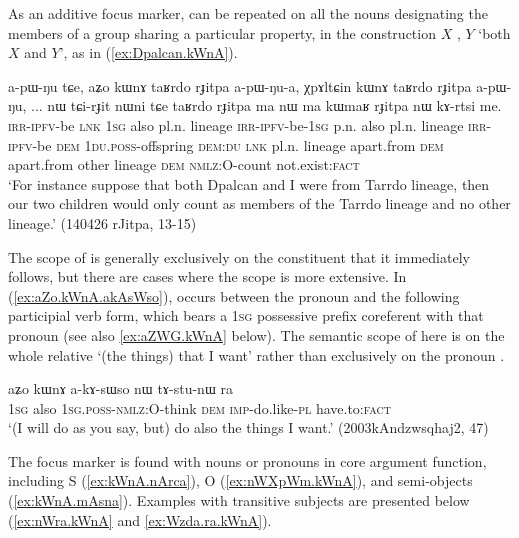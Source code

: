 As an additive focus marker,  can be repeated on all the nouns designating the members of a group sharing a particular property, in the construction $X$ , $Y$   `both $X$ and $Y$', as in (\ref{ex:Dpalcan.kWnA}).

\begin{exe}
\ex \label{ex:Dpalcan.kWnA}
 \gll a-pɯ-ŋu tɕe, aʑo kɯnɤ taʁrdo rɟitpa a-pɯ-ŋu-a, χpɤltɕin kɯnɤ taʁrdo rɟitpa a-pɯ-ŋu, ... nɯ tɕi-rɟit nɯni tɕe taʁrdo rɟitpa ma nɯ ma kɯmaʁ rɟitpa nɯ kɤ-rtsi me.  \\
 \textsc{irr}-\textsc{ipfv}-be \textsc{lnk} \textsc{1sg} also pl.n. lineage  \textsc{irr}-\textsc{ipfv}-be-\textsc{1sg}  p.n. also pl.n. lineage  \textsc{irr}-\textsc{ipfv}-be { } \textsc{dem} \textsc{1du}.\textsc{poss}-offspring \textsc{dem}:\textsc{du} \textsc{lnk} pl.n. lineage apart.from \textsc{dem} apart.from other lineage \textsc{dem} \textsc{nmlz}:O-count not.exist:\textsc{fact} \\
 \glt `For instance suppose that both Dpalcan and I were from Tarrdo lineage, then our two children would only count as members of the Tarrdo lineage and no other lineage.' (140426 rJitpa, 13-15)
\end{exe}

The scope of   is generally exclusively on the constituent that it immediately follows, but there are cases where the scope is more extensive. In (\ref{ex:aZo.kWnA.akAsWso}),  occurs between the pronoun  and the following participial verb form, which bears a \textsc{1sg} possessive prefix  coreferent with that pronoun (see also \ref{ex:aZWG.kWnA} below). The semantic scope of  here is on the whole relative  `(the things) that I want' rather than exclusively on the pronoun .

\begin{exe}
\ex \label{ex:aZo.kWnA.akAsWso}
 \gll aʑo kɯnɤ a-kɤ-sɯso nɯ tɤ-stu-nɯ ra \\
 \textsc{1sg} also \textsc{1sg}.\textsc{poss}-\textsc{nmlz}:O-think \textsc{dem} \textsc{imp}-do.like-\textsc{pl} have.to:\textsc{fact} \\
 \glt `(I will do as you say, but) do also the things I want.' (2003kAndzwsqhaj2, 47)
\end{exe}

 

The focus marker  is found with nouns or pronouns in core argument function, including S (\ref{ex:kWnA.nArca}), O (\ref{ex:nWXpWm.kWnA}), and semi-objects (\ref{ex:kWnA.mAsna}).  Examples with transitive subjects are presented below (\ref{ex:nWra.kWnA} and \ref{ex:Wzda.ra.kWnA}).

